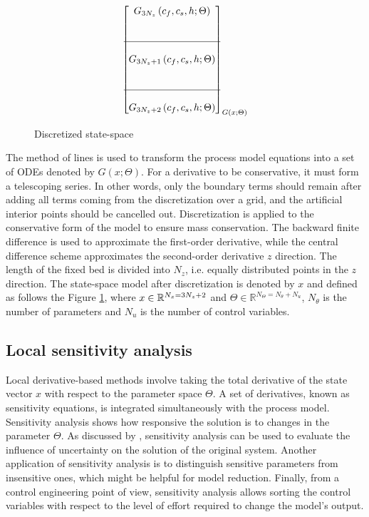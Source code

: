 \documentclass[a4paper,fleqn]{cas-dc}
\begin{document}
\begin{figure}[!h]
{\begin{align*}
{\begin{bmatrix}
						G_{3N_z} \left( c_f,c_s,h; \Theta \right) \\ 
						\\ \\ \hline \\
						G_{3N_z+1} \left( c_f,c_s,h; \Theta \right) \\
						\\ \\ \hline \\
						G_{3N_z+2} \left( c_f,c_s,h; \Theta \right) 
				\end{bmatrix}}_{G \left( x; \Theta \right)} 
		\end{align*} }
	\caption{Discretized state-space}
	\label{fig:discretization}
	\end{figure}

	The method of lines is used to transform the process model equations into a set of ODEs denoted by $G(x;\Theta)$. For a derivative to be conservative, it must form a telescoping series. In other words, only the boundary terms should remain after adding all terms coming from the discretization over a grid, and the artificial interior points should be cancelled out. Discretization is applied to the conservative form of the model to ensure mass conservation. The backward finite difference is used to approximate the first-order derivative, while the central difference scheme approximates the second-order derivative $z$ direction. The length of the fixed bed is divided into $N_z$, i.e. equally distributed points in the $z$ direction. The state-space model after discretization is denoted by $x$ and defined as follows the Figure \ref{fig:discretization}, where ${\color{black}x} \in \mathbb{R}^{N_x = 3N_z+2} $ and $\Theta \in \mathbb{R}^{N_\Theta =  N_{\theta} + N_u } $, $N_{\theta}$ is the number of parameters and $N_{u}$ is the number of control variables.
	
	\subsection{Local sensitivity analysis} \label{CH: Sensitivity_Analysis}
	
	Local derivative-based methods involve taking the total derivative of the state vector $x$ with respect to the parameter space $\Theta$. A set of derivatives, known as sensitivity equations, is integrated simultaneously with the process model. Sensitivity analysis shows how responsive the solution is to changes in the parameter $\Theta$. As discussed by \citet{Dickinson1976}, sensitivity analysis can be used to evaluate the influence of uncertainty on the solution of the original system. Another application of sensitivity analysis is to distinguish sensitive parameters from insensitive ones, which might be helpful for model reduction. Finally, from a control engineering point of view, sensitivity analysis allows sorting the control variables with respect to the level of effort required to change the model's output.
	
\end{document}
